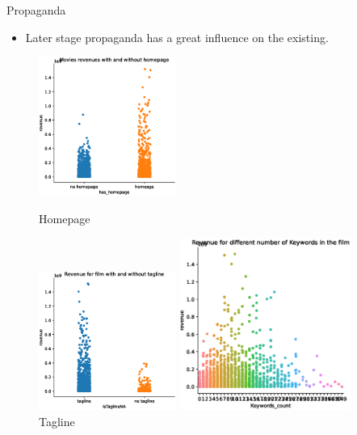 \documentclass[
 size=14pt,
 paper=smartboard,  %
 mode=present, 		%
 display=slides, 	%
 style=tuliplab,  	%
 pauseslide,
 fleqn,leqno]{powerdot}
\begin{document}
\begin{slide}[toc=,bm=]{Propaganda}
  \begin{itemize}
    \item Later stage propaganda has a great influence on the existing.
  \end{itemize}
  \begin{figure}[htbp]
    \centering
    \begin{minipage}[t]{0.48\textwidth}
      \centering
      \includegraphics[width=0.4\textwidth]{figures/has_homepage.eps}
      \vspace{-1.4em}
      \caption{Homepage}
    \end{minipage}
    \begin{minipage}[t]{0.48\textwidth}
      \centering
      \includegraphics[width=0.4\textwidth]{figures/isTanglineNA.eps}
      \vspace{-1.4em}
      \caption{Tagline}
    \end{minipage}
    \begin{minipage}[t]{0.48\textwidth}
      \centering
      \includegraphics[width=0.5\textwidth]{figures/keywords.eps}

\end{minipage}
\end{figure}
\end{slide}
\end{document}
